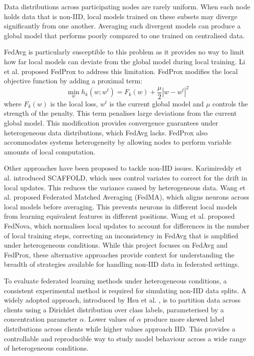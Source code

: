 \documentclass[12pt,openany,a4paper]{book}
\begin{document}
Data distributions across participating nodes are rarely uniform. When each node holds data that is non-IID, local models trained on these subsets may diverge significantly from one another. Averaging such divergent models can produce a global model that performs poorly compared to one trained on centralised data.

FedAvg is particularly susceptible to this problem as it provides no way to limit how far local models can deviate from the global model during local training. Li et al. \cite{liFederatedOptimizationHeterogeneous2020} proposed FedProx to address this limitation. FedProx modifies the local objective function by adding a proximal term:
\begin{equation}
\min_{w} h_k(w; w^t) = F_k(w) + \frac{\mu}{2} | w - w^t |^2
\end{equation}
where $F_k(w)$ is the local loss, $w^t$ is the current global model and $\mu$ controls the strength of the penalty. This term penalises large deviations from the current global model. This modification provides convergence guarantees under heterogeneous data distributions, which FedAvg lacks. FedProx also accommodates systems heterogeneity by allowing nodes to perform variable amounts of local computation.

Other approaches have been proposed to tackle non-IID issues. Karimireddy et al. \cite{karimireddySCAFFOLDStochasticControlled2021} introduced SCAFFOLD, which uses control variates to correct for the drift in local updates. This reduces the variance caused by heterogeneous data. Wang et al. \cite{wangFederatedLearningMatched2020} proposed Federated Matched Averaging (FedMA), which aligns neurons across local models before averaging. This prevents neurons in different local models from learning equivalent features in different positions. Wang et al. \cite{wangTacklingObjectiveInconsistency2020} proposed FedNova, which normalises local updates to account for differences in the number of local training steps, correcting an inconsistency in FedAvg that is amplified under heterogeneous conditions. While this project focuses on FedAvg and FedProx, these alternative approaches provide context for understanding the breadth of strategies available for handling non-IID data in federated settings.

To evaluate federated learning methods under heterogeneous conditions, a consistent experimental method is required for simulating non-IID data splits. A widely adopted approach, introduced by Hsu et al. \cite{hsuMeasuringEffectsNonIdentical2019}, is to partition data across clients using a Dirichlet distribution over class labels, parameterised by a concentration parameter $\alpha$. Lower values of $\alpha$ produce more skewed label distributions across clients while higher values approach IID. This provides a controllable and reproducible way to study model behaviour across a wide range of heterogeneous conditions.
\end{document}
